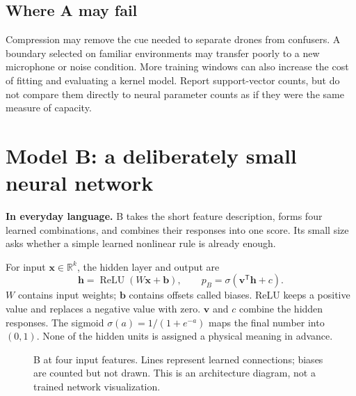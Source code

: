\documentclass[11pt,letterpaper]{article}
\newcommand{\R}{\mathbb{R}}
\newcommand{\plain}[1]{\par\smallskip\noindent\textbf{In everyday language.} #1\par\smallskip}
\begin{document}
\subsection{Where A may fail}
Compression may remove the cue needed to separate drones from confusers.
A boundary selected on familiar environments may transfer poorly to a new
microphone or noise condition. More training windows can also increase the
cost of fitting and evaluating a kernel model. Report support-vector counts,
but do not compare them directly to neural parameter counts as if they were
the same measure of capacity.

\section{Model B: a deliberately small neural network}
\label{sec:modelb}
\plain{B takes the short feature description, forms four learned combinations,
and combines their responses into one score. Its small size asks whether a
simple learned nonlinear rule is already enough.}

For input $\mathbf{x}\in\R^k$, the hidden layer and output are
\begin{equation}
 \mathbf{h}=\operatorname{ReLU}(W\mathbf{x}+\mathbf{b}),\qquad
 p_B=\sigma(\mathbf{v}^{\mathsf T}\mathbf{h}+c).
\end{equation}
$W$ contains input weights; $\mathbf{b}$ contains offsets called biases.
ReLU keeps a positive value and replaces a negative value with zero.
$\mathbf{v}$ and $c$ combine the hidden responses. The sigmoid
$\sigma(a)=1/(1+e^{-a})$ maps the final number into $(0,1)$.
None of the hidden units is assigned a physical meaning in advance.

\begin{figure}[htbp]
\centering
{}
\caption{B at four input features. Lines represent learned connections;
biases are counted but not drawn. This is an architecture diagram, not a
trained network visualization.}
\end{figure}
\end{document}

